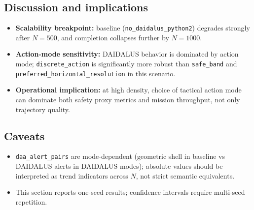 \subsection{Discussion and implications}

\begin{itemize}
\item \textbf{Scalability breakpoint:} baseline (\texttt{no\_daidalus\_python2}) degrades strongly after $N=500$, and completion collapses further by $N=1000$.
\item \textbf{Action-mode sensitivity:} DAIDALUS behavior is dominated by action mode; \texttt{discrete\_action} is significantly more robust than \texttt{safe\_band} and \texttt{preferred\_horizontal\_resolution} in this scenario.
\item \textbf{Operational implication:} at high density, choice of tactical action mode can dominate both safety proxy metrics and mission throughput, not only trajectory quality.
\end{itemize}

\subsection{Caveats}

\begin{itemize}
\item \texttt{daa\_alert\_pairs} are mode-dependent (geometric shell in baseline vs DAIDALUS alerts in DAIDALUS modes); absolute values should be interpreted as trend indicators across $N$, not strict semantic equivalents.
\item This section reports one-seed results; confidence intervals require multi-seed repetition.
\end{itemize}
